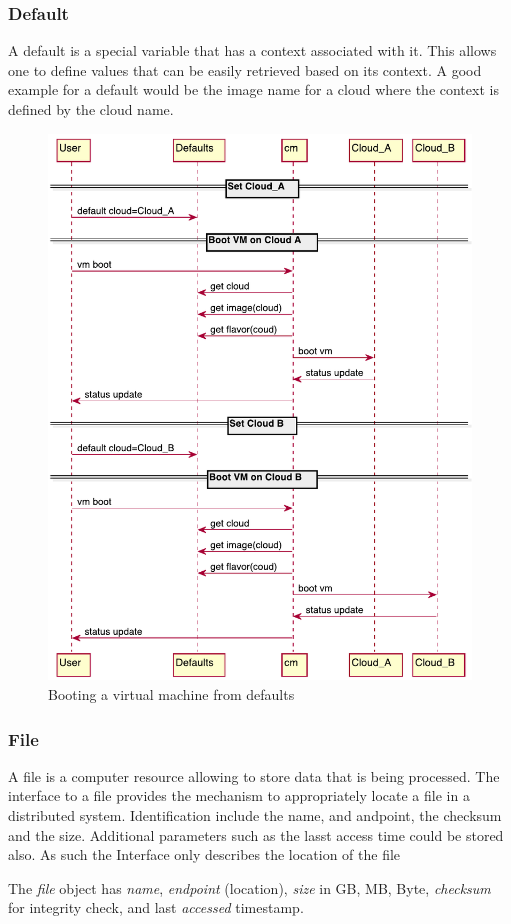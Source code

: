 \documentclass[10pt]{article}
\begin{document}

\subsubsection{Default}

A default is a special variable that has a context associated with
it. This allows one to define values that can be easily retrieved
based on its context. A good example for a default would be the image
name for a cloud where the context is defined by the cloud name.



\begin{figure}[!h]
\centering
\includegraphics[width=0.5\columnwidth]{uml/boot.pdf}
\caption{Booting a virtual machine from defaults}\label{F:uml-boot}
\end{figure}


\subsubsection{File}

A file is a computer resource allowing to store data that is being
processed. The interface to a file provides the mechanism to
appropriately locate a file in a distributed system. Identification
include the name, and andpoint, the checksum and the size. Additional
parameters such as the lasst access time could be stored also. As such
the Interface only describes the location of the file 

The \textit{file} object has \textit{name}, \textit{endpoint} (location), \textit{size}
in GB, MB, Byte, \textit{checksum} for integrity check, and last
\textit{accessed} timestamp. 
\end{document}
